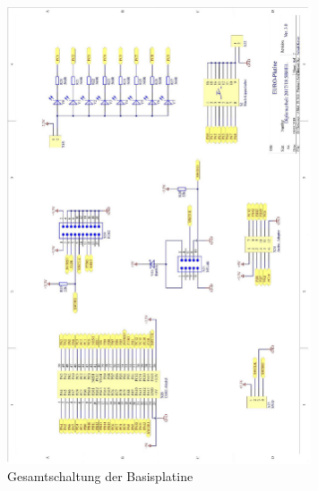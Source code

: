 \begin{figure}[htb]\ContinuedFloat
    \centering
    \includegraphics[width=0.8\textwidth]{Schuh/Pictures/Basis-Schaltung4}
    \caption[Gesamtschaltung der Basisplatine]{Gesamtschaltung der \gls{Basisplatine}}
\end{figure}
